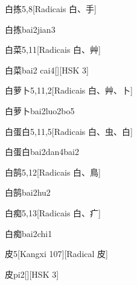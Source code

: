 \begin{entry}{白拣}{5,8}[Radicais ⽩、⼿]
  \begin{phonetics}{白拣}{bai2jian3}
  \end{phonetics}
\end{entry}

\begin{entry}{白菜}{5,11}[Radicais ⽩、⾋]
  \begin{phonetics}{白菜}{bai2 cai4}[][HSK 3]
  \end{phonetics}
\end{entry}

\begin{entry}{白萝卜}{5,11,2}[Radicais ⽩、⾋、⼘]
  \begin{phonetics}{白萝卜}{bai2luo2bo5}
  \end{phonetics}
\end{entry}

\begin{entry}{白蛋白}{5,11,5}[Radicais ⽩、⾍、⽩]
  \begin{phonetics}{白蛋白}{bai2dan4bai2}
  \end{phonetics}
\end{entry}

\begin{entry}{白鹄}{5,12}[Radicais ⽩、⿃]
  \begin{phonetics}{白鹄}{bai2hu2}
  \end{phonetics}
\end{entry}

\begin{entry}{白痴}{5,13}[Radicais ⽩、⽧]
  \begin{phonetics}{白痴}{bai2chi1}
  \end{phonetics}
\end{entry}

\begin{entry}{皮}{5}[Kangxi 107][Radical ⽪]
  \begin{phonetics}{皮}{pi2}[][HSK 3]
  \end{phonetics}
\end{entry}

